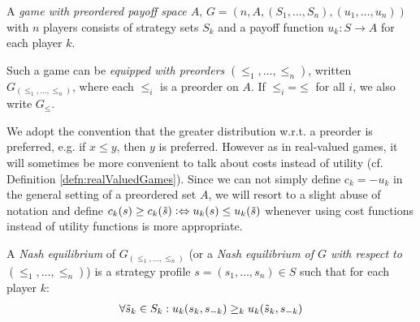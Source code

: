 \documentclass[a4paper]{scrreprt}
\begin{document}
    \begin{defn}
        A \emph{game with preordered payoff space $A$}, $G = (n, A, (S_1, \dots, S_n), (u_1, \dots, u_n))$ with $n$ players consists of strategy sets $S_k$ and a payoff function $u_k: S \to A$ for each player $k$.
        
        Such a game can be \emph{equipped with preorders} $(\leq_1, \dots, \leq_n)$, written $G_{(\leq_1, \dots, \leq_n)}$, where each $\leq_i$ is a preorder on $A$.
        If $\leq_i \mathbin{=} \leq$ for all $i$, we also write $G_\leq$.
    \end{defn}
    We adopt the convention that the greater distribution w.r.t. a preorder is preferred, e.g. if $x \leq y$, then $y$ is preferred. However as in real-valued games, it will sometimes be more convenient to talk about costs instead of utility (cf. Definition \ref{defn:realValuedGames}). Since we can not simply define $c_k = -u_k$ in the general setting of a preordered set $A$, we will resort to a slight abuse of notation and define $c_k(s) \geq c_k(\tilde{s}) \mathrel{\vcentcolon\Leftrightarrow} u_k(s) \leq u_k(\tilde{s})$ whenever using cost functions instead of utility functions is more appropriate.
    
    \begin{defn}
        A \emph{Nash equilibrium} of $G_{(\leq_1, \dots, \leq_n)}$ (or a \emph{Nash equilibrium of $G$ with respect to $(\leq_1, \dots, \leq_n)$})
        is a strategy profile $s = (s_1, \dots, s_n) \in S$ such that for each player $k$:
        \begin{gather}
            \forall \tilde{s}_k \in S_k: u_k(s_k, s_{-k}) \geq_k u_k(\tilde{s}_k, s_{-k})
            \label{eq:nashEquilibriumPreorderedPayoffs}
        \end{gather}
    \end{defn}
    
\end{document}
